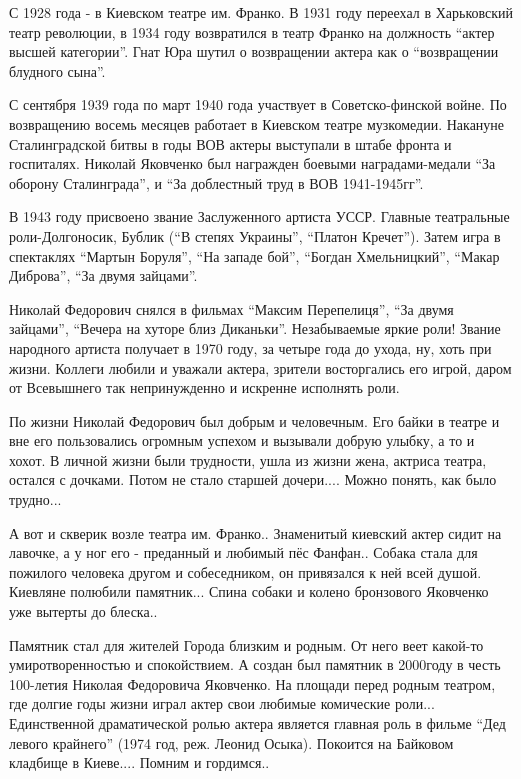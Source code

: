 С 1928 года - в Киевском театре им. Франко. В 1931 году переехал в Харьковский
театр революции, в 1934 году возвратился в театр Франко на должность
\enquote{актер высшей категории}. Гнат Юра шутил о возвращении актера как о
\enquote{возвращении блудного сына}. 

С сентября 1939 года по март 1940 года участвует в Советско-финской войне. По
возвращению восемь месяцев работает в Киевском театре музкомедии. Накануне
Сталинградской битвы  в годы ВОВ актеры выступали в штабе фронта и госпиталях.
Николай Яковченко  был награжден боевыми наградами-медали \enquote{За оборону
Сталинграда}, и \enquote{За доблестный труд в ВОВ 1941-1945гг}. 

В 1943 году присвоено звание Заслуженного артиста УССР. Главные театральные
роли-Долгоносик, Бублик (\enquote{В степях Украины}, \enquote{Платон Кречет}).
Затем игра в спектаклях \enquote{Мартын Боруля}, \enquote{На западе бой},
\enquote{Богдан Хмельницкий}, \enquote{Макар Диброва}, \enquote{За двумя
зайцами}.

Николай Федорович снялся в фильмах \enquote{Максим Перепелиця}, \enquote{За
двумя зайцами}, \enquote{Вечера на хуторе близ Диканьки}. Незабываемые яркие
роли! Звание народного артиста получает в 1970 году, за четыре года до ухода,
ну, хоть при жизни. Коллеги любили и уважали актера, зрители восторгались его
игрой, даром от Всевышнего так непринужденно и искренне исполнять роли. 

По жизни Николай Федорович был добрым и человечным. Его байки в театре и вне
его пользовались огромным успехом и вызывали добрую улыбку, а то и хохот. В
личной жизни были трудности, ушла из жизни жена, актриса театра, остался с
дочками. Потом не стало старшей дочери.... Можно понять, как было трудно... 

А вот и скверик возле театра им. Франко.. Знаменитый киевский актер сидит на
лавочке, а у ног его - преданный и любимый пёс Фанфан.. Собака стала для
пожилого человека другом и собеседником, он привязался к ней всей душой.
Киевляне полюбили памятник... Спина собаки и колено бронзового Яковченко уже
вытерты до блеска.. 

Памятник стал для жителей Города близким и родным. От него веет какой-то
умиротворенностью и спокойствием. А создан был памятник в 2000году в честь
100-летия Николая Федоровича Яковченко. На площади перед родным театром, где
долгие годы жизни играл актер свои любимые комические роли... Единственной
драматической ролью актера является главная роль в фильме \enquote{Дед левого крайнего}
(1974 год, реж. Леонид Осыка). Покоится на Байковом кладбище в Киеве.... Помним
и гордимся..

